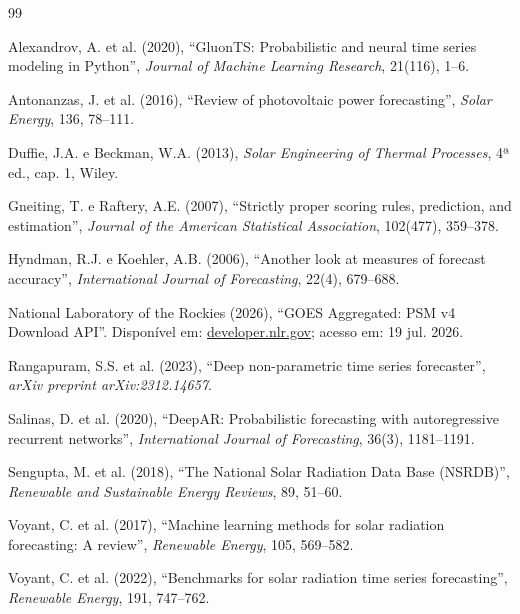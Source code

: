 \documentclass[12pt,a4paper,fleqn]{article}
\begin{document}
\begin{thebibliography}{99}

Alexandrov, A. et al. (2020), ``GluonTS: Probabilistic and neural time series modeling in Python'', \textit{Journal of Machine Learning Research}, 21(116), 1--6.

Antonanzas, J. et al. (2016), ``Review of photovoltaic power forecasting'', \textit{Solar Energy}, 136, 78--111.

Duffie, J.A. e Beckman, W.A. (2013), \textit{Solar Engineering of Thermal Processes}, 4ª ed., cap. 1, Wiley.

Gneiting, T. e Raftery, A.E. (2007), ``Strictly proper scoring rules, prediction, and estimation'', \textit{Journal of the American Statistical Association}, 102(477), 359--378.

Hyndman, R.J. e Koehler, A.B. (2006), ``Another look at measures of forecast accuracy'', \textit{International Journal of Forecasting}, 22(4), 679--688.

National Laboratory of the Rockies (2026), ``GOES Aggregated: PSM v4 Download API''. Disponível em: \href{https://developer.nlr.gov/docs/solar/nsrdb/nsrdb-GOES-aggregated-v4-0-0-download/}{developer.nlr.gov}; acesso em: 19 jul. 2026.

Rangapuram, S.S. et al. (2023), ``Deep non-parametric time series forecaster'', \textit{arXiv preprint arXiv:2312.14657}.

Salinas, D. et al. (2020), ``DeepAR: Probabilistic forecasting with autoregressive recurrent networks'', \textit{International Journal of Forecasting}, 36(3), 1181--1191.

Sengupta, M. et al. (2018), ``The National Solar Radiation Data Base (NSRDB)'', \textit{Renewable and Sustainable Energy Reviews}, 89, 51--60.

Voyant, C. et al. (2017), ``Machine learning methods for solar radiation forecasting: A review'', \textit{Renewable Energy}, 105, 569--582.

Voyant, C. et al. (2022), ``Benchmarks for solar radiation time series forecasting'', \textit{Renewable Energy}, 191, 747--762.

\end{thebibliography}
\end{document}
